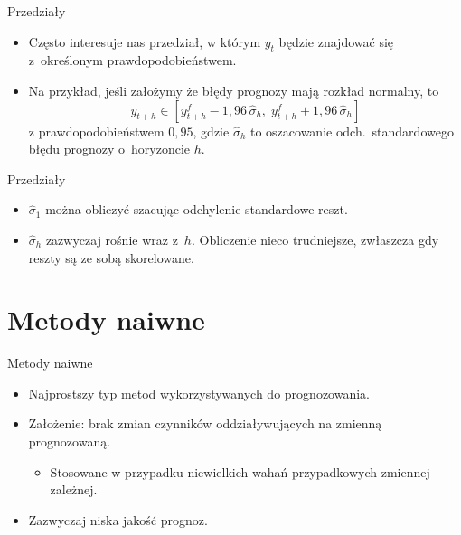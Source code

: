 \documentclass[11pt,usenames,dvipsnames,aspectratio=169]{beamer}
\begin{document}
\begin{frame}{Przedziały}
\begin{itemize}
    \item Często interesuje nas przedział, w którym $y_{t}$ będzie znajdować się z~określonym prawdopodobieństwem.
    \item Na przykład, jeśli założymy że błędy prognozy mają rozkład normalny, to
    \[
    y_{t+h}\in\left[y_{t+h}^{f}-1{,}96\,\hat{\sigma}_{h},\;y_{t+h}^{f}+1{,}96\,\hat{\sigma}_{h}\right]
    \]
    z prawdopodobieństwem $0{,}95$, gdzie $\hat{\sigma}_{h}$ to oszacowanie odch.\ standardowego błędu prognozy o~horyzoncie $h$.
\end{itemize}
\end{frame}

\begin{frame}{Przedziały}
\begin{itemize}
    \item $\hat{\sigma}_{1}$ można obliczyć szacując odchylenie standardowe reszt.
    \item $\hat{\sigma}_{h}$ zazwyczaj rośnie wraz z~$h$. Obliczenie nieco trudniejsze, zwłaszcza gdy reszty są ze sobą skorelowane.
\end{itemize}
\end{frame}

\section{Metody naiwne}

\begin{frame}{Metody naiwne}
\begin{itemize}
    \item Najprostszy typ metod wykorzystywanych do prognozowania.
    \item Założenie: brak zmian czynników oddziaływujących na zmienną prognozowaną.
    \begin{itemize}
        \item Stosowane w przypadku niewielkich wahań przypadkowych zmiennej zależnej.
    \end{itemize}
    \item Zazwyczaj niska jakość prognoz.
\end{itemize}
\end{frame}
\end{document}
